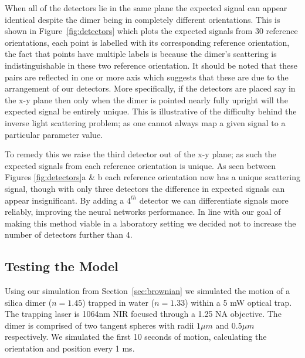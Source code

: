 \documentclass[final,  3p]{elsarticle}
\begin{document}
 When all of the detectors lie in the same plane the expected signal can appear identical despite the dimer being in completely different orientations. This is shown in Figure~\ref{fig:detectors} which plots the expected signals from 30 reference orientations, each point is labelled with its corresponding reference orientation, the fact that points have multiple labels is because the dimer's scattering is indistinguishable in these two reference orientation. It should be noted that these pairs are reflected in one or more axis which suggests that these are due to the arrangement of our detectors. More specifically, if the detectors are placed say in the x-y plane then only when the dimer is pointed nearly fully upright will the expected signal be entirely unique. This is illustrative of the difficulty behind the inverse light scattering problem; as one cannot always map a given signal to a particular parameter value.

To remedy this we raise the third detector out of the x-y plane; as such the expected signals from each reference orientation is unique. As seen between Figures \ref{fig:detectors}a \& b each reference orientation now has a unique scattering signal, though with only three detectors the difference in expected signals can appear insignificant. By adding a $4^{th}$ detector we can differentiate signals more reliably, improving the neural networks performance.   In line with our goal of making this method viable in a laboratory setting we decided not to increase the number of detectors further than 4. 

\subsection{Testing the Model}
\label{sec:test}
Using our simulation from Section~\ref{sec:brownian} we simulated the motion of a silica dimer ($n = 1.45$) trapped in water ($n = 1.33$) within a 5 mW optical trap. The trapping laser is 1064nm NIR focused through a 1.25 NA objective. The dimer is comprised of two tangent spheres with radii $1 \mu m$ and $0.5 \mu m$ respectively. We simulated the first 10 seconds of motion, calculating the orientation and position every 1 ms. 
\end{document}
